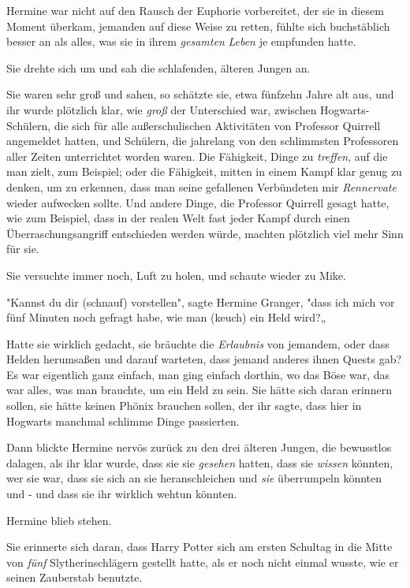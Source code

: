 {Hermine war nicht auf den Rausch der Euphorie vorbereitet, der sie in diesem Moment überkam, jemanden auf diese Weise zu retten, fühlte sich buchstäblich besser an als alles, was sie in ihrem \emph{gesamten} \emph{Leben} je empfunden hatte.

Sie drehte sich um und sah die schlafenden, älteren Jungen an.

Sie waren sehr groß und sahen, so schätzte sie, etwa fünfzehn Jahre alt aus, und ihr wurde plötzlich klar, wie \emph{groß} der Unterschied war, zwischen Hogwarts-Schülern, die sich für alle außerschulischen Aktivitäten von Professor Quirrell angemeldet hatten, und Schülern, die jahrelang von den schlimmsten Professoren aller Zeiten unterrichtet worden waren. Die Fähigkeit, Dinge zu \emph{treffen}, auf die man zielt, zum Beispiel; oder die Fähigkeit, mitten in einem Kampf klar genug zu denken, um zu erkennen, dass man seine gefallenen Verbündeten mir \emph{Rennervate} wieder aufwecken sollte. Und andere Dinge, die Professor Quirrell gesagt hatte, wie zum Beispiel, dass in der realen Welt fast jeder Kampf durch einen Überraschungsangriff entschieden werden würde, machten plötzlich viel mehr Sinn für sie.

Sie versuchte immer noch, Luft zu holen, und schaute wieder zu Mike.

"Kannst du dir (schnauf) vorstellen", sagte Hermine Granger, "dass ich mich vor fünf Minuten noch gefragt habe, wie man (keuch) ein Held wird?„

Hatte sie wirklich gedacht, sie bräuchte die \emph{Erlaubnis} von jemandem, oder dass Helden herumsaßen und darauf warteten, dass jemand anderes ihnen Quests gab? Es war eigentlich ganz einfach, man ging einfach dorthin, wo das Böse war, das war alles, was man brauchte, um ein Held zu sein. Sie hätte sich daran erinnern sollen, sie hätte keinen Phönix brauchen sollen, der ihr sagte, dass hier in Hogwarts manchmal schlimme Dinge passierten.

Dann blickte Hermine nervös zurück zu den drei älteren Jungen, die bewusstlos dalagen, als ihr klar wurde, dass sie sie \emph{gesehen} hatten, dass sie \emph{wissen} könnten, wer sie war, dass sie sich an sie heranschleichen und \emph{sie} überrumpeln könnten und - und dass sie ihr wirklich wehtun könnten.

Hermine blieb stehen.

Sie erinnerte sich daran, dass Harry Potter sich am ersten Schultag in die Mitte von \emph{fünf} Slytherinschlägern gestellt hatte, als er noch nicht einmal wusste, wie er seinen Zauberstab benutzte.

}
